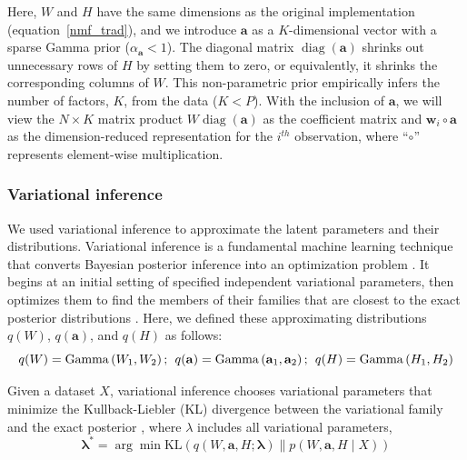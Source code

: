 Here, $W$ and $H$ have the same dimensions as the original implementation (equation~\ref{nmf_trad}), and we introduce $\mathbf{a}$ as a $K$-dimensional vector with a sparse Gamma prior ($\alpha_\mathbf{a} < 1$). The diagonal matrix $\operatorname{diag}(\mathbf{a})$ shrinks out unnecessary rows of $H$ by setting them to zero, or equivalently, it shrinks the corresponding columns of $W$. This non-parametric prior empirically infers the number of factors, $K$, from the data ($K < P$). With the inclusion of $\mathbf{a}$, we will view the $N \times K$ matrix product $W\operatorname{diag}(\mathbf{a})$ as the coefficient matrix and $\mathbf{w}_{i} \circ \mathbf{a}$ as the dimension-reduced representation for the $i^{th}$ observation, where ``$\circ$'' represents element-wise multiplication.

\subsubsection{Variational inference}
\label{methods_vi}
We used variational inference to approximate the latent parameters and their distributions. Variational inference is a fundamental machine learning technique that converts Bayesian posterior inference into an optimization problem \cite{jordan2004graphical,ormerod2010explaining}. It begins at an initial setting of specified independent variational parameters, then optimizes them to find the members of their families that are closest to the exact posterior distributions \cite{wainwright2008graphical}. Here, we defined these approximating distributions $q(W)$, $q(\mathbf{a})$, and $q(H)$ as follows:
\begin{equation}
q(W) =\operatorname{Gamma}\left(W_{1}, W_{2}\right); \hspace{1ex} q(\mathbf{a})=\operatorname{Gamma}\left(\mathbf{a}_{1}, \mathbf{a}_{2}\right); \hspace{1ex}
q(H) =\operatorname{Gamma}\left(H_{1}, H_{2}\right)
\end{equation}

Given a dataset $X$, variational inference chooses variational parameters that minimize the Kullback-Liebler (KL) divergence between the variational family and the exact posterior \cite{jordan1999introduction}, where $\lambda$ includes all variational parameters, 
\begin{equation}
    \boldsymbol{\lambda}^{*}=\arg \min \mathrm{KL}(q(W, \mathbf{a}, H ; \boldsymbol{\lambda}) \| p(W, \mathbf{a}, H \mid X))
\end{equation}


